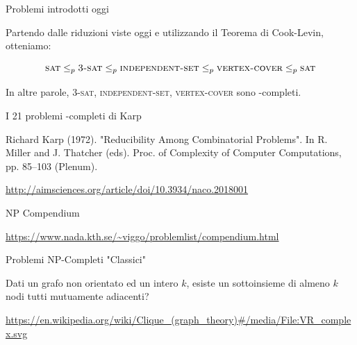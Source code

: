 \begin{frame}{Problemi introdotti oggi}

Partendo dalle riduzioni viste oggi e utilizzando il Teorema di Cook-Levin,
otteniamo:

\[
  \textsc{sat} \leq_p \textsc{3-sat} \leq_p \textsc{independent-set} \leq_p \textsc{vertex-cover} \leq_p \textsc{sat}
\]

\bigskip
In altre parole, \textsc{3-sat}, \textsc{independent-set}, \textsc{vertex-cover}
sono \NP-completi.

\end{frame}


\begin{frame}{I 21 problemi \NP-completi di Karp}

\vspace{-9pt}
\begin{myboxtitle}[Bibliografia]
Richard Karp (1972). "Reducibility Among Combinatorial Problems". In R.  Miller and J. Thatcher (eds). Proc. of Complexity of Computer Computations, pp. 85–103 (Plenum).
\end{myboxtitle}


\tiny
\url{http://aimsciences.org/article/doi/10.3934/naco.2018001}
\end{frame}

\begin{frame}{NP Compendium}

\vspace{-12pt}

\tiny
\url{https://www.nada.kth.se/\~viggo/problemlist/compendium.html}


\end{frame}


\begin{frame}{Problemi NP-Completi "Classici"}

\vspace{-9pt}
\begin{myboxtitle}
Dati un grafo non orientato ed un intero $k$, esiste un sottoinsieme di almeno
$k$ nodi tutti mutuamente adiacenti?
\end{myboxtitle}


\vfill
\tiny
\url{https://en.wikipedia.org/wiki/Clique\_(graph_theory)\#/media/File:VR\_complex.svg}

\end{frame}

